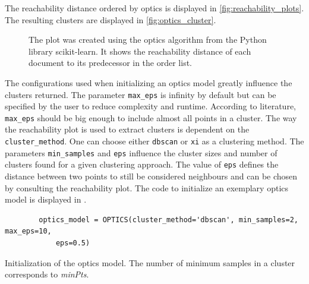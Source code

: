 The reachability distance ordered by \ac{optics} is displayed in \autoref{fig:reachability_plots}.
The resulting clusters are displayed in \autoref{fig:optics_cluster}.

\begin{figure}%
    \centering
    \qquad
    \caption[Reachability distances]{The plot was created using the \ac{optics} algorithm from the Python library scikit-learn.
    It shows the reachability distance of each document to its predecessor in the order list.}%
    \label{fig:reachability_plots}%
\end{figure}

The configurations used when initializing an \ac{optics} model greatly influence the clusters returned.
The parameter \texttt{max\_eps} is infinity by default but can be specified by the user to reduce complexity and runtime.
According to literature, \texttt{max\_eps} should be big enough to include almost all points in a cluster.
The way the reachability plot is used to extract clusters is dependent on the \texttt{cluster\_method}. 
One can choose either \texttt{dbscan} or \texttt{xi} as a clustering method.
The parameters \texttt{min\_samples} and \texttt{eps} influence the cluster sizes and number of clusters found for a given clustering approach.
The value of \texttt{eps} defines the distance between two points to still be considered neighbours 
and can be chosen by consulting the reachability plot.
The code to initialize an exemplary \ac{optics} model is displayed in .

\begin{listing}[htp]
    \begin{verbatim}
        optics_model = OPTICS(cluster_method='dbscan', min_samples=2, max_eps=10, 
            eps=0.5)
    \end{verbatim}
    \caption[Initialization of the \ac{optics} model]{Initialization of the \ac{optics} model.
    The number of minimum samples in a cluster corresponds to \textit{minPts}.
    }
    \label{lst:optics_model}
\end{listing}
